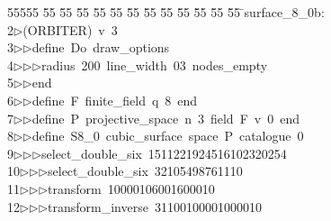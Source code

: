 %
%
\begin{tabbing}
55555 \= 55 \= 55 \= 55 \= 55 \= 55 \= 55 \= 55 \= 55 \= 55 \= 55 \= 55 \= 55 \= \>surface\_8\_0b:\\[0pt]
2\>$\triangleright$\>(ORBITER)\ v\ 3\ \\[0pt]
3\>$\triangleright$\>$\triangleright$\>define\ Do\ draw\_options\ \\[0pt]
4\>$\triangleright$\>$\triangleright$\>$\triangleright$\>radius\ 200\ line\_width\ 03\ nodes\_empty\ \\[0pt]
5\>$\triangleright$\>$\triangleright$\>end\ \\[0pt]
6\>$\triangleright$\>$\triangleright$\>define\ F\ finite\_field\ q\ 8\ end\ \\[0pt]
7\>$\triangleright$\>$\triangleright$\>define\ P\ projective\_space\ n\ 3\ field\ F\ v\ 0\ end\ \\[0pt]
8\>$\triangleright$\>$\triangleright$\>define\ S8\_0\ cubic\_surface\ space\ P\ catalogue\ 0\ \\[0pt]
9\>$\triangleright$\>$\triangleright$\>$\triangleright$\>select\_double\_six\ 1511221924516102320254\ \\[0pt]
10\>$\triangleright$\>$\triangleright$\>$\triangleright$\>select\_double\_six\ 32105498761110\ \\[0pt]
11\>$\triangleright$\>$\triangleright$\>$\triangleright$\>transform\ 10000106001600010\ \\[0pt]
12\>$\triangleright$\>$\triangleright$\>$\triangleright$\>transform\_inverse\ 31100100001000010\ \\[0pt]

\end{tabbing}
